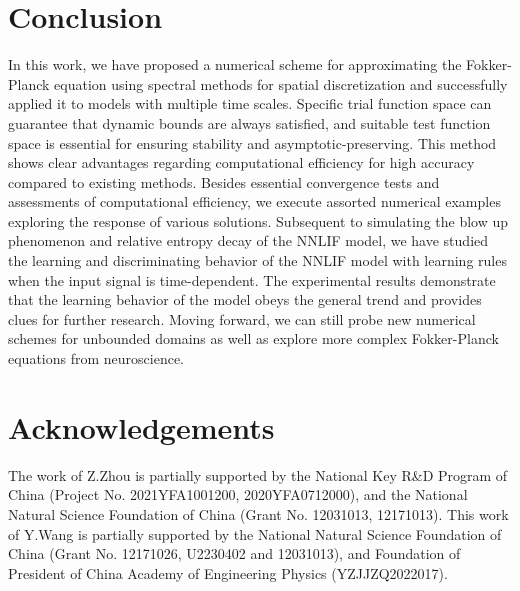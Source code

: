 \section{Conclusion} \label{sec:conclusion}


In this work, we have proposed a numerical scheme for approximating the Fokker-Planck equation using spectral methods for spatial discretization and successfully applied it to models with multiple time scales. Specific trial function space can guarantee that dynamic bounds are always satisfied, and suitable test function space is essential for ensuring stability and asymptotic-preserving. This method shows clear advantages regarding computational efficiency for high accuracy compared to existing methods. Besides essential convergence tests and assessments of computational efficiency, we execute assorted numerical examples exploring the response of various solutions. Subsequent to simulating the blow up phenomenon and relative entropy decay of the NNLIF model, we have studied the learning and discriminating behavior of the NNLIF model with learning rules when the input signal is time-dependent. The experimental results demonstrate that the learning behavior of the model obeys the general trend and provides clues for further research. Moving forward, we can still probe new numerical schemes for unbounded domains as well as explore more complex Fokker-Planck equations from neuroscience.



\section*{Acknowledgements}
The work of Z.Zhou is partially supported by the National Key R\&D Program
of China (Project No. 2021YFA1001200, 2020YFA0712000), and the National Natural Science Foundation of China (Grant No. 12031013, 12171013).
This work of Y.Wang is partially supported by the National Natural Science Foundation of China (Grant No. 12171026, U2230402 and 12031013), and Foundation of President of China Academy of Engineering Physics (YZJJZQ2022017).